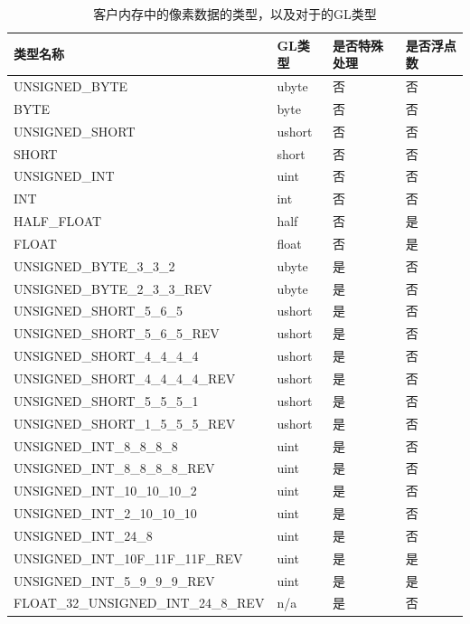 \begin{table}
\caption{客户内存中的像素数据的类型，以及对于的GL类型}
\label{t:api-data-type}
\centering
\begin{tabular}{>{\small}p{}|>{\small}p{}|>{\small}p{}|>{\small}p{}}
\hline 
   类型名称 & GL类型 & 是否特殊处理 & 是否浮点数\\
    \hline  
    UNSIGNED\_BYTE        &  ubyte  &  否   &否\\
    BYTE                  &  byte   &  否   &否\\
    UNSIGNED\_SHORT       &  ushort &  否   &否\\
    SHORT                 &  short  &  否   &否\\
    UNSIGNED\_INT         &  uint   &  否   &否\\
    INT                   &  int    &  否   &否\\
    HALF\_FLOAT           &  half   &  否   &是\\
    FLOAT                 &  float  &  否   &是\\
    UNSIGNED\_BYTE\_3\_3\_2               &  ubyte  &  是   &否\\
    UNSIGNED\_BYTE\_2\_3\_3\_REV          &  ubyte  &  是   &否\\
    UNSIGNED\_SHORT\_5\_6\_5              &  ushort &  是   &否\\
    UNSIGNED\_SHORT\_5\_6\_5\_REV         &  ushort &  是   &否\\
    UNSIGNED\_SHORT\_4\_4\_4\_4           &  ushort &  是   &否\\
    UNSIGNED\_SHORT\_4\_4\_4\_4\_REV      &  ushort &  是   &否\\
    UNSIGNED\_SHORT\_5\_5\_5\_1           &  ushort &  是   &否\\
    UNSIGNED\_SHORT\_1\_5\_5\_5\_REV      &  ushort &  是   &否\\
    UNSIGNED\_INT\_8\_8\_8\_8             &  uint   &  是   &否\\
    UNSIGNED\_INT\_8\_8\_8\_8\_REV        &  uint   &  是   &否\\
    UNSIGNED\_INT\_10\_10\_10\_2          &  uint   &  是   &否\\
    UNSIGNED\_INT\_2\_10\_10\_10          &  uint   &  是   &否\\
    UNSIGNED\_INT\_24\_8                  &  uint   &  是   &否\\
    UNSIGNED\_INT\_10F\_11F\_11F\_REV     &  uint   &  是   &是\\
    UNSIGNED\_INT\_5\_9\_9\_9\_REV        &  uint   &  是   &是\\
    FLOAT\_32\_UNSIGNED\_INT\_24\_8\_REV  &  n/a    &  是   &否\\
   
 \hline 
\end{tabular}
\end{table}

